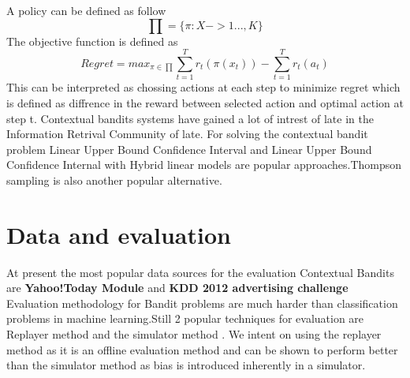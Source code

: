 \documentclass[11pt,letterpaper]{article}
\newcommand{\blue}[1]{\textcolor{RoyalBlue}{#1}}
\newcommand{\instructions}[1]{\blue{\textit{#1}}}
\renewcommand{\instructions}[1]{}
\begin{document}
A policy can be defined as follow 
\begin{equation*}
\prod = \{\pi : X -> {1...,K}\}
\end{equation*}
The objective function is defined as 
\begin{equation*}
Regret = max_{\pi \in \prod }\sum_{t=1}^{T} r_t(\pi(x_t)) - \sum_{t=1}^{T} r_t(a_t)
\end{equation*}
This can be interpreted as chossing actions at each step to minimize regret which is defined as diffrence in the reward between selected action and optimal action at step t.
Contextual bandits systems have gained a lot of intrest of late in the Information Retrival Community of late.
For solving the contextual bandit problem Linear Upper Bound Confidence Interval and Linear Upper Bound Confidence Internal with Hybrid linear models are popular approaches.Thompson sampling is also another popular alternative.\cite{Multi59:online}
\cite{agraw23:online}
\cite{Adver67:online}
\section*{Data and evaluation}
\instructions{Do you have data to train and test your system on? How
  will you evaluate your system?}
At present the most popular data sources for the evaluation Contextual Bandits are \textbf{Yahoo!Today Module} and \textbf{KDD 2012 advertising challenge}
Evaluation methodology for Bandit problems are much harder than classification problems in machine learning.Still 2 popular techniques for evaluation are Replayer method \cite{Li2010} and the simulator method \cite{Li2011}\cite{Zeng2016}.
We intent on using the replayer method as it is an offline evaluation method and can be shown to perform better than the simulator method as bias is introduced inherently in a simulator.

 
\end{document}
